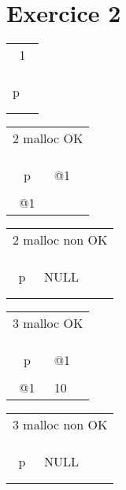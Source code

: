 \section{Exercice 2}

\begin{tabular}{c|p{1cm}|}
	\multicolumn{2}{c|}{1}\\
	&\\
	\hline
	&\\	
	\hline
	&\\
	\hline
	p&\\
	\hline
	&\\
	\hline
	&\\	
	\hline
\end{tabular}
\begin{tabular}{c|p{1cm}|}
	\multicolumn{2}{c|}{2 malloc OK}\\
	&\\
	\hline
	&\\	
	\hline
	&\\
	\hline
	p& @1\\
	\hline
	&\\
	\hline
	@1&\\	
	\hline
\end{tabular}
\begin{tabular}{c|p{1cm}|}
	\multicolumn{2}{c|}{2 malloc non OK}\\
	&\\
	\hline
	&\\	
	\hline
	&\\
	\hline
	p&NULL\\
	\hline
	&\\
	\hline
	&\\	
	\hline
\end{tabular}
\begin{tabular}{c|p{1cm}|}
	\multicolumn{2}{c|}{3 malloc OK}\\
	&\\
	\hline
	&\\	
	\hline
	&\\
	\hline
	p&@1\\
	\hline
	&\\
	\hline
	@1&10\\	
	\hline
\end{tabular}
\begin{tabular}{c|p{1cm}|}
	\multicolumn{2}{c|}{3 malloc non OK}\\
	&\\
	\hline
	&\\	
	\hline
	&\\
	\hline
	p&NULL\\
	\hline
	&\\
	\hline
	&\\	
	\hline
\end{tabular}

